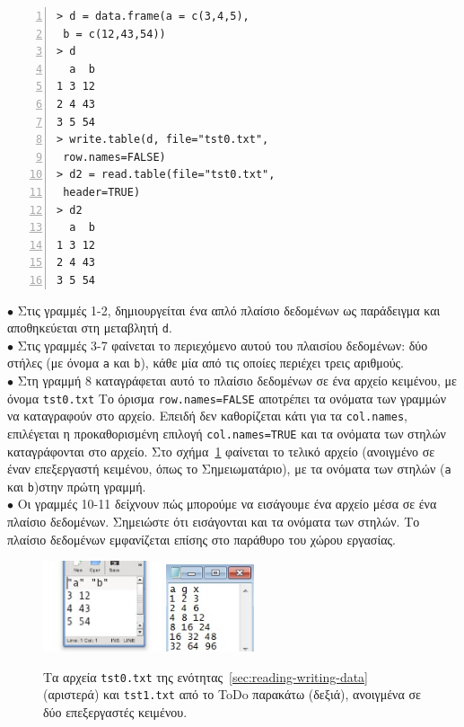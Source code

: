 \documentclass[a4paper,10pt,twocolumn]{article}
\begin{document}
\begin{Verbatim}[frame=single,numbers=left,gobble=0, xleftmargin=0.35cm, numbersep=0.1cm]
> d = data.frame(a = c(3,4,5), 
 b = c(12,43,54))
> d
  a  b
1 3 12
2 4 43
3 5 54
> write.table(d, file="tst0.txt",
 row.names=FALSE)
> d2 = read.table(file="tst0.txt", 
 header=TRUE)
> d2
  a  b
1 3 12
2 4 43
3 5 54
\end{Verbatim}
\noindent $\bullet$ Στις γραμμές 1-2, δημιουργείται ένα απλό πλαίσιο δεδομένων ως παράδειγμα και αποθηκεύεται 
στη μεταβλητή \texttt{d}. \\
\noindent $\bullet$ Στις γραμμές 3-7 φαίνεται το περιεχόμενο αυτού του πλαισίου δεδομένων: δύο στήλες (με 
όνομα \texttt{a} και \texttt{b}), κάθε μία από τις οποίες περιέχει τρεις αριθμούς.\\
\noindent $\bullet$ Στη γραμμή 8 καταγράφεται αυτό το πλαίσιο δεδομένων σε ένα αρχείο κειμένου, με όνομα
\texttt{tst0.txt} Το όρισμα \verb!row.names=FALSE! αποτρέπει τα ονόματα των γραμμών να καταγραφούν στο αρχείο.
Επειδή δεν καθορίζεται κάτι για τα \texttt{col.names}, επιλέγεται η προκαθορισμένη επιλογή \verb!col.names=TRUE!
και τα ονόματα των στηλών καταγράφονται στο αρχείο. Στο σχήμα~\ref{fig:tst0} φαίνεται το τελικό αρχείο 
(ανοιγμένο σε έναν επεξεργαστή κειμένου, όπως το Σημειωματάριο), με τα ονόματα των στηλών (\texttt{a} και
\texttt{b})στην πρώτη γραμμή. \\
\noindent $\bullet$ Οι γραμμές 10-11 δείχνουν πώς μπορούμε να εισάγουμε ένα αρχείο μέσα σε ένα πλαίσιο
δεδομένων. Σημειώστε ότι εισάγονται και τα ονόματα των στηλών. Το πλαίσιο δεδομένων εμφανίζεται επίσης στο
παράθυρο του χώρου εργασίας.\\

\begin{figure}[h]
  \centering
  \includegraphics[width=3.5cm]{img/tst0.jpeg}
  \includegraphics[width=2.6cm]{img/tst1.jpg}
  \caption{Τα αρχεία \texttt{tst0.txt} της ενότητας~\ref{sec:reading-writing-data}
    (αριστερά) και \texttt{tst1.txt} από το ToDo παρακάτω (δεξιά), ανοιγμένα σε δύο επεξεργαστές κειμένου.}
  \label{fig:tst0}
\end{figure}
\end{document}
